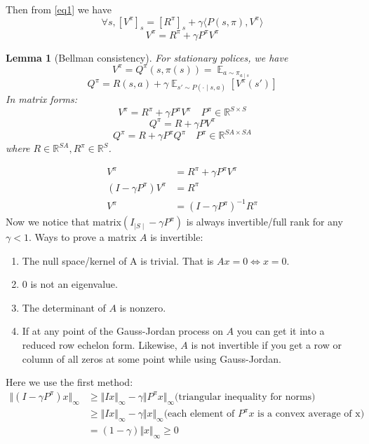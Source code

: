 \documentclass{report}
\newtheorem{lemma}[theorem]{Lemma}
\DeclareMathOperator{\E}{\mathbb{E}}
\begin{document}
Then from \ref{eq1} we have
\begin{equation}
    \forall s, [V^{\pi}]_s=[R^{\pi}]_s+\gamma \langle P(s,\pi),V^{\pi}\rangle
\end{equation}
\[
V^{\pi} =  R^{\pi}+\gamma P^{\pi}V^{\pi}
\]
\begin{lemma}[Bellman consistency] 
    For stationary polices, we have \[
        V^{\pi}=Q^{\pi}(s,\pi(s))=\E_{a\sim \pi_{a\mid s}}
    \] \[
       Q^{\pi}=R(s,a)+\gamma \E_{s'\sim P(\cdot \mid s,a)}[V^{\pi}(s')]
    \]
    In matrix forms:
    \[
        V^{\pi}=R^{\pi}+\gamma P^{\pi}V^{\pi} \quad P^{\pi} \in \mathbb{R}^{S\times S}
    \] \[
        Q^{\pi}=R+\gamma PV^{\pi} 
    \] \[
        Q^{\pi}=R+\gamma P^{\pi}Q^{\pi} \quad P^{\pi} \in \mathbb{R}^{SA\times SA}
    \] where $R \in \mathbb{R}^{SA},R^{\pi} \in \mathbb{R}^S$.
\end{lemma}
\begin{align*}
V^{\pi} &=  R^{\pi}+\gamma P^{\pi}V^{\pi} \\ 
(I-\gamma P^{\pi})V^{\pi} &=  R^{\pi} \\
V^{\pi} &= (I-\gamma P^{\pi})^{-1}R^{\pi} 
\end{align*}   
Now we notice that matrix$(I_{\mid S \mid}-\gamma P^{\pi})$ is always invertible/full rank for any $\gamma < 1$.  
Ways to prove a matrix $A$ is invertible:
\begin{enumerate}
    \item The null space/kernel of  A  is trivial. That is $Ax=0 \iff x=0$.
    \item $0$ is not an eigenvalue.
    \item The determinant of $A$ is nonzero.
    \item If at any point of the Gauss-Jordan process on $A$ you can get it into a reduced row echelon form. Likewise,  $A$ is not invertible if you get a row or column of all zeros at some point while using Gauss-Jordan.
\end{enumerate}
Here we use the first method:
\begin{equation}
\begin{split}
    \Vert(I-\gamma P^{\pi})x\Vert_{\infty}
    &\geq \Vert Ix \Vert_{\infty} -\gamma \Vert P^{\pi} x \Vert_{\infty} \text{(triangular inequality for norms)} \\
    &\geq \Vert Ix \Vert_{\infty} - \gamma \Vert x \Vert_{\infty} \text{(each element of $P^{\pi}x$ is a convex average of x)} \\
   & = (1-\gamma)\Vert x \Vert_{\infty} \geq 0
\end{split}
\end{equation}
\end{document}
